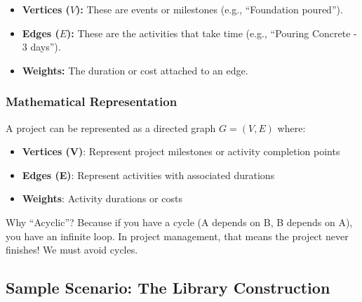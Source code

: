 \documentclass[
  letterpaper,
  DIV=11,
  numbers=noendperiod]{scrreprt}
\providecommand{\tightlist}{%
  \setlength{\itemsep}{0pt}\setlength{\parskip}{0pt}}
\begin{document}
\begin{itemize}
\tightlist
\item
  \textbf{Vertices (\(V\)):} These are events or milestones (e.g.,
  ``Foundation poured'').
\item
  \textbf{Edges (\(E\)):} These are the activities that take time (e.g.,
  ``Pouring Concrete - 3 days'').
\item
  \textbf{Weights:} The duration or cost attached to an edge.
\end{itemize}

\subsubsection{Mathematical
Representation}\label{mathematical-representation}

A project can be represented as a directed graph \(G = (V, E)\) where:

\begin{itemize}
\tightlist
\item
  \textbf{Vertices (V)}: Represent project milestones or activity
  completion points
\item
  \textbf{Edges (E)}: Represent activities with associated durations
\item
  \textbf{Weights}: Activity durations or costs
\end{itemize}

\begin{tcolorbox}[enhanced jigsaw, leftrule=.75mm, rightrule=.15mm, colback=white, colbacktitle=quarto-callout-note-color!10!white, arc=.35mm, opacityback=0, toptitle=1mm, bottomrule=.15mm, bottomtitle=1mm, titlerule=0mm, title=\textcolor{quarto-callout-note-color}{\faInfo}\hspace{0.5em}{Insight}, toprule=.15mm, left=2mm, coltitle=black, breakable, colframe=quarto-callout-note-color-frame, opacitybacktitle=0.6]

Why ``Acyclic''? Because if you have a cycle (A depends on B, B depends
on A), you have an infinite loop. In project management, that means the
project never finishes! We must avoid cycles.

\end{tcolorbox}

\subsection{Sample Scenario: The Library
Construction}\label{sample-scenario-the-library-construction}
\end{document}
